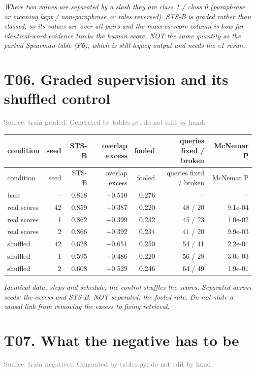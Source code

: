 \documentclass[10pt]{article}
\begin{document}
\textit{Where two values are separated by a slash they are class 1 / class 0 (paraphrase or meaning kept / non-paraphrase or roles reversed). STS-B is graded rather than classed, so its values are over all pairs and the mass-vs-score column is how far identical-word evidence tracks the human score. NOT the same quantity as the partial-Spearman table (F6), which is still legacy output and needs the e1 rerun.}
\clearpage

\section*{T06. Graded supervision and its shuffled control}
\textcolor{gray}{Source: train graded. Generated by tables.py; do not edit by hand.}

\footnotesize
\begin{longtable}{lrrrrrr}
\toprule
condition & seed & STS-B & overlap excess & fooled & queries fixed / broken & McNemar P \\
\midrule
\endfirsthead
\toprule
condition & seed & STS-B & overlap excess & fooled & queries fixed / broken & McNemar P \\
\midrule
\endhead
\bottomrule
\endfoot
base & -- & 0.818 & +0.510 & 0.276 & -- & -- \\
real scores & 42 & 0.859 & +0.387 & 0.220 & 48 / 20 & 9.1e-04 \\
real scores & 1 & 0.862 & +0.399 & 0.232 & 45 / 23 & 1.0e-02 \\
real scores & 2 & 0.866 & +0.392 & 0.234 & 41 / 20 & 9.9e-03 \\
shuffled & 42 & 0.628 & +0.651 & 0.250 & 54 / 41 & 2.2e-01 \\
shuffled & 1 & 0.595 & +0.486 & 0.220 & 56 / 28 & 3.0e-03 \\
shuffled & 2 & 0.608 & +0.529 & 0.246 & 64 / 49 & 1.9e-01 \\
\end{longtable}
\normalsize

\textit{Identical data, steps and schedule; the control shuffles the scores. Separated across seeds: the excess and STS-B. NOT separated: the fooled rate. Do not state a causal link from removing the excess to fixing retrieval.}
\clearpage

\section*{T07. What the negative has to be}
\textcolor{gray}{Source: train negatives. Generated by tables.py; do not edit by hand.}
\end{document}
